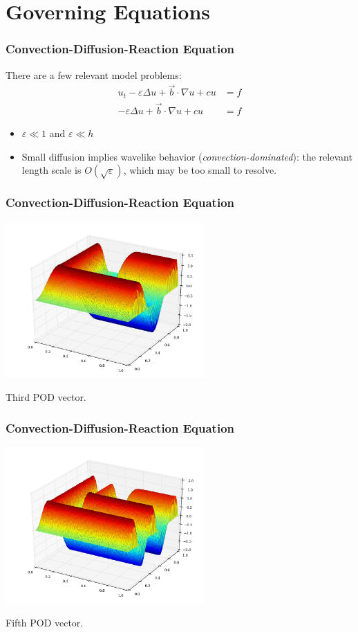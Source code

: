 \documentclass[8pt]{beamer}
\begin{document}
\section{Governing Equations}
    \begin{frame}
        \frametitle{Convection-Diffusion-Reaction Equation}
        There are a few relevant model problems:
        \begin{align}
            u_t - \varepsilon \Delta u + \vec{b} \cdot \nabla u + c u &= f    \\
            -\varepsilon \Delta u + \vec{b} \cdot \nabla u + c u      &= f
        \end{align}
        \begin{itemize}
            \item \(\varepsilon \ll 1\) and \(\varepsilon \ll h\)
            \item Small diffusion implies wavelike behavior
                  (\emph{convection-dominated}): the relevant length scale is
                  \(O(\sqrt{\varepsilon})\), which may be too small to resolve.
        \end{itemize}
    \end{frame}

    \begin{frame}
        \frametitle{Convection-Diffusion-Reaction Equation}
        \begin{center}
            \includegraphics[width=3in]{Pictures/CDR/cdr_vector_3.png}

            Third POD vector.
        \end{center}
    \end{frame}

    \begin{frame}
        \frametitle{Convection-Diffusion-Reaction Equation}
        \begin{center}
            \includegraphics[width=3in]{Pictures/CDR/cdr_vector_5.png}

            Fifth POD vector.
        \end{center}
    \end{frame}
\end{document}
